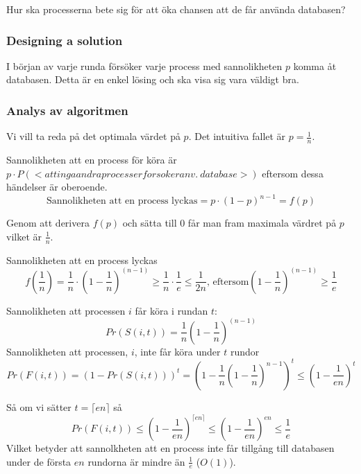 \documentclass[a4paper]{report}
\begin{document}
Hur ska processerna bete sig för att öka chansen att de får använda databasen?
\subsubsection{Designing a solution}
I början av varje runda försöker varje process med sannolikheten $p$ komma åt
databasen. Detta är en enkel lösing och ska visa sig vara väldigt bra.

\subsubsection{Analys av algoritmen}
Vi vill ta reda på det optimala värdet på $p$. Det intuitiva fallet är $p =
\frac{1}{n}$.

Sannolikheten att en process för köra är $p \cdot P(<att inga andra processer
forsoker anv.\ database>)$ eftersom dessa händelser är oberoende.
\begin{equation}
	\mbox{Sannolikheten att en process lyckas} = p \cdot (1 - p)^{n - 1} = f(p)
\end{equation}

Genom att derivera $f(p)$ och sätta till $0$ får man fram maximala värdret på
$p$ vilket är $\frac{1}{n}$.

Sannolikheten att en process lyckas
\begin{equation}
	f(\frac{1}{n}) = \frac{1}{n} \cdot (1 - \frac{1}{n})^{(n-1)} \geq
	\frac{1}{n} \cdot \frac{1}{e} \leq \frac{1}{2n}\mbox{, eftersom} (1 -
	\frac{1}{n})^{(n-1)} \geq \frac{1}{e}
\end{equation}

Sannolikheten att processen $i$ får köra i rundan $t$:
\begin{equation}
	Pr(S(i,t)) = \frac{1}{n}(1 - \frac{1}{n})^{(n-1)}
\end{equation}
Sannolikheten att processen, $i$, inte får köra under $t$ rundor
\begin{equation}
	Pr(F(i,t)) = (1 - Pr(S(i,t)))^t = (1 - \frac{1}{n}(1 -
	\frac{1}{n})^{n-1})^t \leq (1 - \frac{1}{en})^t
\end{equation}

Så om vi sätter $t = \lceil{}en\rceil$ så
\begin{equation}
	Pr(F(i,t)) \leq (1 - \frac{1}{en})^{\lceil{}en\rceil} \leq (1 - \frac{1}{en})^{en}
	\leq \frac{1}{e}
\end{equation}
Vilket betyder att sannolkheten att en process inte får tillgång till databasen
under de första $en$ rundorna är mindre än $\frac{1}{e}$ ($O(1)$).
\end{document}

